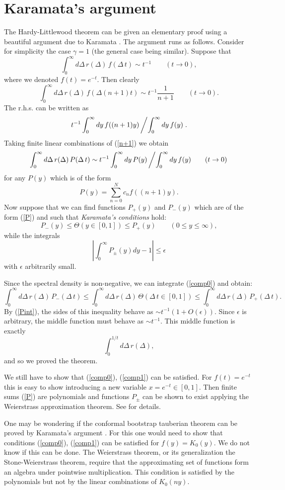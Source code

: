 \documentclass[12pt]{article}
\newcommand{\reef}[1]{(\ref{#1})}
\def\eps{\epsilon}
\newcommand{\beq}{\begin{equation}}
\newcommand{\eeq}{\end{equation}}
\def\le{\leqslant}
\def\eps{\epsilon}
\numberwithin{equation}{section}
\begin{document}
\section{Karamata's argument} 
\label{Karamata}
The Hardy-Littlewood theorem can be given an elementary proof using a beautiful argument due to Karamata \cite{Titchmarsh}. The argument runs as follows. Consider for simplicity the case $\gamma=1$ (the general case being similar). Suppose that
\beq
\int_0^\infty d\Delta\, r(\Delta)\, f(\Delta\, t)\sim t^{-1} \qquad(t\to0),
\eeq
where we denoted $f(t)=e^{-t}$. Then clearly
\beq
\label{n+1}
 \int_0^\infty d\Delta\, r(\Delta)\, f(\Delta (n+1) t)\sim t^{-1} \frac{1}{n+1}\qquad(t\to0).
\eeq
The r.h.s. can be written as 
\beq
t^{-1}\int_0^\infty dy\,f((n+1)y)\left/\int_0^\infty dy\,f(y)\right..
\eeq
Taking finite linear combinations of \reef{n+1} we obtain
\beq
\label{Pint}
\int_0^\infty d\Delta\, r(\Delta)\, P(\Delta\, t)\sim t^{-1} \int_0^\infty dy\,P(y)\left/\int_0^\infty dy\,f(y)\qquad(t\to0)\right.
\eeq
for any $P(y)$ which is of the form
\beq
\label{P}
P(y)=\sum_{n=0}^N c_n f((n+1)y).
\eeq
Now suppose that we can find functions $P_+(y)$ and $P_-(y)$ which are of the form \reef{P}
and such that \emph{Karamata's conditions} hold:
\beq
\label{comp0}
\tag{K1}
P_-(y)\le \Theta(y\in[0,1]) \le P_+(y)\qquad (0\le y\le \infty),
\eeq
while the integrals
\beq
\label{comp1}
\tag{K2}
\left|\int_0^\infty P_\pm(y) dy -1\right |\le \eps
\eeq
with $\eps$ arbitrarily small.

Since the spectral density is non-negative, we can integrate \reef{comp0} and obtain:
\beq
\int_0^\infty d\Delta\, r(\Delta)\, P_-(\Delta\, t)\le \int_0^\infty d\Delta\, r(\Delta)\, \Theta(\Delta\, t \in[0,1]) \le
\int_0^\infty d\Delta\, r(\Delta)\, P_+(\Delta\, t).
\eeq
By \reef{Pint}, the sides of this inequality behave as $\sim t^{-1}(1+O(\eps))$. Since $\eps$ is arbitrary, the middle function must behave as $\sim t^{-1}$. This middle function is exactly 
\beq
\int_0^{1/t} d\Delta\, r(\Delta),
\eeq
and so we proved the theorem.

We still have to show that \reef{comp0}, \reef{comp1} can be satisfied. For $f(t)=e^{-t}$ this is easy to show introducing a new variable $x=e^{-t}\in[0,1]$. Then finite sums \reef{P} are polynomials and functions $P_\pm$ can be shown to exist applying the Weierstrass approximation theorem. See \cite{Titchmarsh} for details.

One may be wondering if the conformal bootstrap tauberian theorem can be proved by Karamata's argument \cite{Fitzpatrick:2014vua}. For this one would need to show that conditions \reef{comp0}, \reef{comp1} can be satisfied for $f(y)=K_0(y)$. We do not know if this can be done. The Weierstrass theorem, or its generalization the Stone-Weierstrass theorem, require that the approximating set of functions form an algebra under pointwise multiplication. 
This condition is satisfied by the polynomials but not by the linear combinations of $K_0(n y)$.
\end{document}
